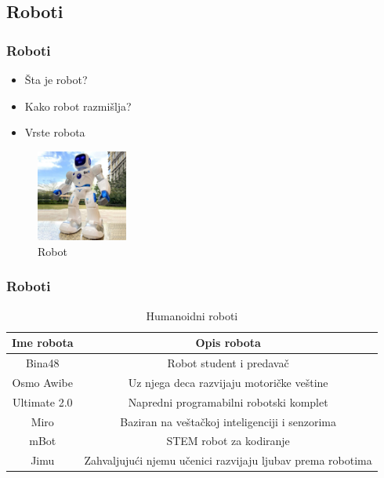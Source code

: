 \documentclass[10pt]{beamer}
\begin{document}
\subsection{Roboti}
\begin{frame}[fragile]\frametitle{Roboti}
	\begin{itemize}	
        \item Šta je robot?
        \item Kako robot razmišlja?
        \item Vrste robota
    \end{itemize}

    \begin{figure}[h!]
        \centering\includegraphics[height=3cm]{robot1.jpg} 
        \caption{Robot}
        \label{fig:robot}
        \end{figure}

\end{frame}

\begin{frame}[fragile]\frametitle{Roboti}
\begin{table}[ht!]
\begin{center}
\caption{Humanoidni roboti}
\begin{tabular}{|c|c|} \hline
\textbf{Ime robota}& \textbf{Opis robota}\\ \hline
Bina48 &Robot student i predavač\\ \hline
Osmo Awibe &Uz njega deca razvijaju motoričke veštine\\ \hline
Ultimate 2.0 &Napredni programabilni robotski komplet\\ \hline
Miro &Baziran na veštačkoj inteligenciji i senzorima\\ \hline
mBot &STEM robot za kodiranje\\ \hline
Jimu &Zahvaljujući njemu učenici razvijaju ljubav prema robotima\\ \hline
\end{tabular}
\label{tab:tabela1}
\end{center}
\end{table}
\end{frame}
\end{document}
